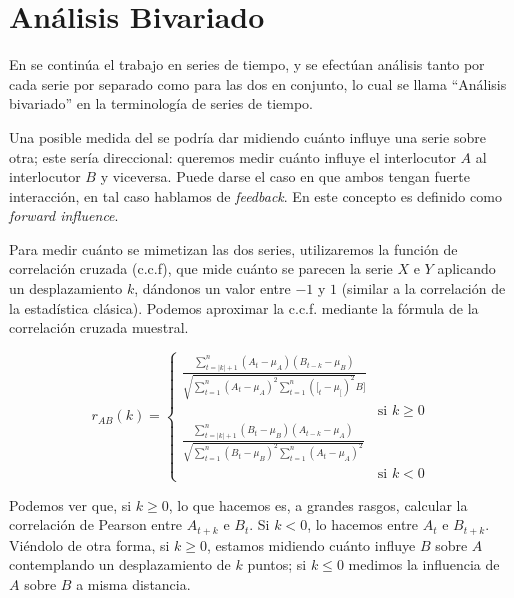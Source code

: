 \section{Análisis Bivariado}

\newcommand{\varnorm}[1] {
    (#1_t - \mu_{#1})
}

\newcommand{\squarederr}[1]{
    \sum\limits_{t=1}^n \varnorm{#1}^2
}

\newcommand{\crosscorr}[2]{
  \frac{\sum\limits_{t=|k|+1}^n \varnorm{#1} (#2_{t-k} - \mu_{#2})}{
    \sqrt{\squarederr{#1} \squarederr{#2}}
  } \\
}

\newcommand{\corrdenom}[2]{\sqrt{\squarederr{#1} \squarederr{#2}}}

En \cite{KOU2008.2} se continúa el trabajo en series de tiempo, y se efectúan análisis tanto por cada serie por separado como para las dos en conjunto, lo cual se llama ``Análisis bivariado'' en la terminología de series de tiempo.

Una posible medida del \entrainment se podría dar midiendo cuánto influye una serie sobre otra; este \entrainment sería direccional: queremos medir cuánto influye el interlocutor $A$ al interlocutor $B$ y viceversa. Puede darse el caso en que ambos tengan fuerte interacción, en tal caso hablamos de \emph{feedback}. En \cite{gravano2015backward} este concepto es definido como \emph{forward influence}.


Para medir cuánto se mimetizan las dos series, utilizaremos la función de correlación cruzada (c.c.f)\cite{CHATFIELD}, que mide cuánto se parecen la serie $X$ e $Y$ aplicando un desplazamiento $k$, dándonos un valor entre $-1$ y $1$ (similar a la correlación de la estadística clásica). Podemos aproximar la c.c.f. mediante la fórmula de la correlación cruzada muestral.

\begin{equation}
  r_{AB}(k) =
  \left\{
    \begin{array}{ll}
      \frac{\sum\limits_{t=|k|+1}^n \varnorm{A} (B_{t-k} - \mu_{B})}{\corrdenom{A}[B]} \\ & \mbox{si } k \geq 0 \\
      \crosscorr{B}{A} & \mbox{si } k < 0
    \end{array}
  \right.
\end{equation}

Podemos ver que, si $k \geq 0$, lo que hacemos es, a grandes rasgos, calcular la correlación de Pearson entre $A_{t+k}$ e $B_t$. Si $k < 0$, lo hacemos entre $A_t$ e $B_{t+k}$. Viéndolo de otra forma, si $k \geq 0$, estamos midiendo cuánto influye $B$ sobre $A$ contemplando un desplazamiento de $k$ puntos; si $k \leq 0$ medimos la influencia de $A$ sobre $B$ a misma distancia.


